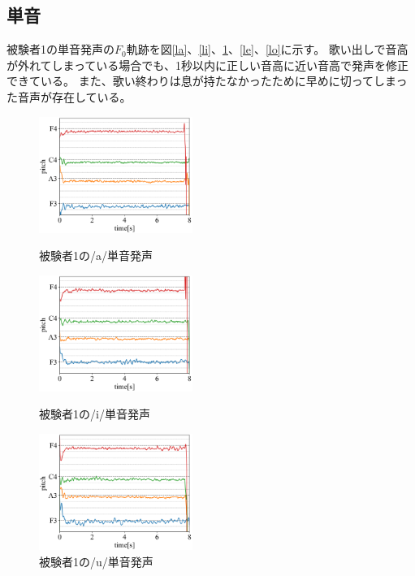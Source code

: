 \documentclass[10.5ptj,a4j,dvipdfmx,uplatex, oneside, openany, report]{jsbook}%
\begin{document}
\subsection{単音}
被験者1の単音発声の$F_0$軌跡を図\ref{la}、\ref{li}、\ref{lu}、\ref{le}、\ref{lo}に示す。
歌い出しで音高が外れてしまっている場合でも、1秒以内に正しい音高に近い音高で発声を修正できている。
また、歌い終わりは息が持たなかったために早めに切ってしまった音声が存在している。


\begin{figure}[htbp]
    \begin{minipage}{0.33\hsize}
        \begin{center}
            \includegraphics[width=5cm]{long/long_1_a.png}
            \caption{被験者1の/a/単音発声}
            \label{la}
        \end{center}
    \end{minipage}
    \begin{minipage}{0.33\hsize}
        \begin{center}
            \includegraphics[width=5cm]{long/long_1_i.png}
            \caption{被験者1の/i/単音発声}
            \label{li}
        \end{center}
    \end{minipage}
    \begin{minipage}{0.33\hsize}
        \begin{center}
            \includegraphics[width=5cm]{long/long_1_u.png} 
            \caption{被験者1の/u/単音発声}
            \label{lu}
        \end{center}
    \end{minipage}
\end{figure}
\end{document}
